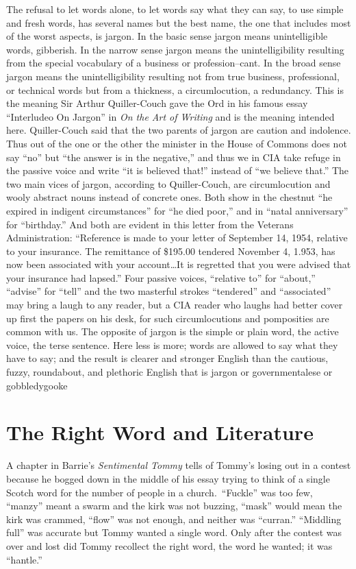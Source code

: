 \documentclass[
    oneside,
    11pt,
    draft
]{memoir}
\begin{document}
The refusal to let words alone, to let words say what they can say, to use simple and fresh words, has several names but the best name, the one that includes most of the worst aspects, is jargon. In the basic sense jargon means unintelligible words, gibberish. In the narrow sense jargon means the unintelligibility resulting from the special vocabulary of a business or profession--cant. In the broad sense jargon means the unintelligibility resulting not from true business, professional, or technical words but from a thickness, a circumlocution, a redundancy. This is the meaning Sir Arthur Quiller-Couch gave the Ord in his famous essay \enquote{Interludeo On Jargon} in \emph{On the Art of Writing} and is the meaning intended here. Quiller-Couch said that the two parents of jargon are caution and indolence. Thus out of the one or the other the minister in the House of Commons does not say \enquote{no} but \enquote{the answer is in the negative,} and thus we in CIA take refuge in the passive voice and write \enquote{it is believed that!} instead of \enquote{we believe that.} The two main vices of jargon, according to Quiller-Couch, are circumlocution and wooly abstract nouns instead of concrete ones. Both show in the chestnut \enquote{he expired in indigent circumstances} for \enquote{he died poor,} and in \enquote{natal anniversary} for \enquote{birthday.} And both are evident in this letter from the Veterans Administration: \enquote{Reference is made to your letter of September 14, 1954, relative to your insurance. The remittance of \$195.00 tendered November 4, 1.953, has now been associated with your account\dots It is regretted that you were advised that your insurance had lapsed.} Four passive voices, \enquote{relative to} for \enquote{about,} \enquote{advise} for \enquote{tell} and the two masterful strokes \enquote{tendered} and \enquote{associated} may bring a laugh to any reader, but a CIA reader who laughs had better cover up first the papers on his desk, for such circumlocutions and pomposities are common with us. The opposite of jargon is the simple or plain word, the active voice, the terse sentence. Here less is more; words are allowed to say what they have to say; and the result is clearer and stronger English than the cautious, fuzzy, roundabout, and plethoric English that is jargon or governmentalese or gobbledygooke

\chapter{The Right Word and Literature}
A chapter in Barrie's \emph{Sentimental Tommy} tells of Tommy's losing out in a contest because he bogged down in the middle of his essay trying to think of a single Scotch word for the number of people in a church.\ \enquote{Fuckle} was too few, \enquote{manzy} meant a swarm and the kirk was not buzzing, \enquote{mask} would mean the kirk was crammed, \enquote{flow} was not enough, and neither was \enquote{curran.} \enquote{Middling full} was accurate but Tommy wanted a single word. Only after the contest was over and lost did Tommy recollect the right word, the word he wanted; it was \enquote{hantle.}
\end{document}
